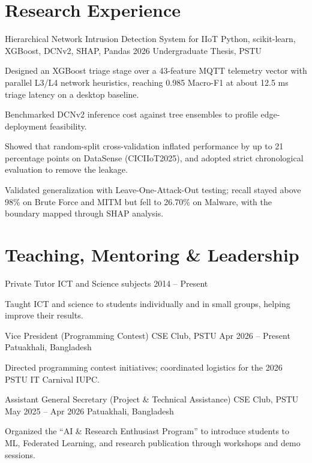 \documentclass[11pt, a4paper]{article}
\begin{document}
\section{Research Experience}
\cvProject
    {Hierarchical Network Intrusion Detection System for IIoT}
    {Python, scikit-learn, XGBoost, DCNv2, SHAP, Pandas}
    {2026}
    {Undergraduate Thesis, PSTU}
    {
        \item Designed an XGBoost triage stage over a 43-feature MQTT telemetry vector with parallel L3/L4 network heuristics, reaching 0.985 Macro-F1 at about 12.5 ms triage latency on a desktop baseline.
        \item Benchmarked DCNv2 inference cost against tree ensembles to profile edge-deployment feasibility.
        \item Showed that random-split cross-validation inflated performance by up to 21 percentage points on DataSense (CICIIoT2025), and adopted strict chronological evaluation to remove the leakage.
        \item Validated generalization with Leave-One-Attack-Out testing; recall stayed above 98\% on Brute Force and MITM but fell to 26.70\% on Malware, with the boundary mapped through SHAP analysis.
    }

\section{Teaching, Mentoring \& Leadership}
\cvExperience
    {Private Tutor}
    {ICT and Science subjects}
    {2014 -- Present}
    {}
    {
        \item Taught ICT and science to students individually and in small groups, helping improve their results.
    }

\cvExperience
    {Vice President (Programming Contest)}
    {CSE Club, PSTU}
    {Apr 2026 -- Present}
    {Patuakhali, Bangladesh}
    {
        \item Directed programming contest initiatives; coordinated logistics for the 2026 PSTU IT Carnival IUPC.
    }

\cvExperience
    {Assistant General Secretary (Project \& Technical Assistance)}
    {CSE Club, PSTU}
    {May 2025 -- Apr 2026}
    {Patuakhali, Bangladesh}
    {
        \item Organized the ``AI \& Research Enthusiast Program'' to introduce students to ML, Federated Learning, and research publication through workshops and demo sessions.
    }
\end{document}
